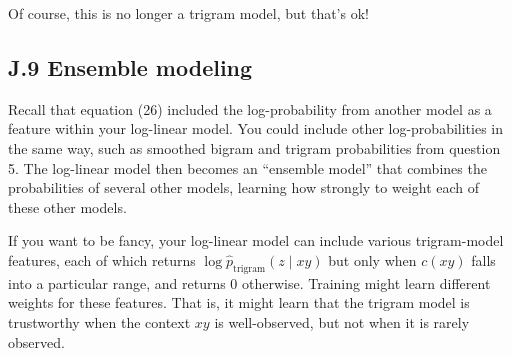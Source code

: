 Of course, this is no longer a trigram model, but that’s ok! 

\subsection*{J.9 Ensemble modeling}

Recall that equation (26) included the log-probability from another model as a feature within your log-linear 
model. You could include other log-probabilities in the same way, such as smoothed bigram and trigram 
probabilities from question 5. The log-linear model then becomes an “ensemble model” that combines the 
probabilities of several other models, learning how strongly to weight each of these other models. 

If you want to be fancy, your log-linear model can include various trigram-model features, each of 
which returns $\log \hat{p}_{\text{trigram}}(z \mid xy)$ but only when $c(xy)$ falls into a particular range, and returns 0 otherwise. 
Training might learn different weights for these features. That is, it might learn that the trigram model is 
trustworthy when the context $xy$ is well-observed, but not when it is rarely observed. 




